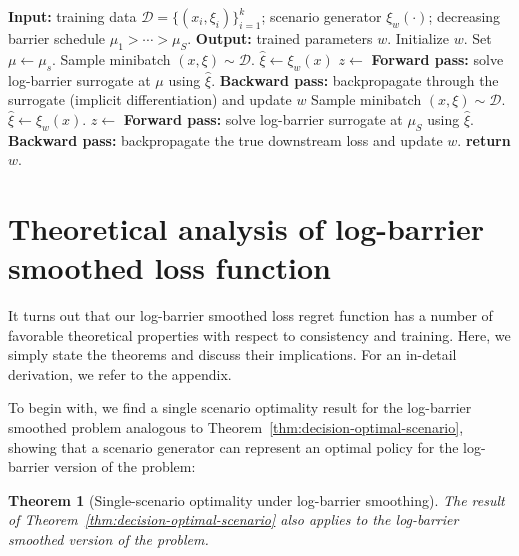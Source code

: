 \documentclass{article}
\theoremstyle{plain}
\newtheorem{theorem}{Theorem}
\theoremstyle{definition}
\theoremstyle{remark}
\begin{document}
\begin{algorithm}[H]
\caption{Interior point based decision-focused scenario generation.}
\label{alg:ip-scenario-gen}
\begin{algorithmic}[1]
\Statex \textbf{Input:} training data $\mathcal D=\{(x_i,\xi_i)\}_{i=1}^k$; scenario generator $\xi_w(\cdot)$;
decreasing barrier schedule $\mu_1>\cdots>\mu_S$.
\Statex \textbf{Output:} trained parameters $w$.
\State Initialize $w$.
 
    \State Set $\mu \gets \mu_s$.
        \State Sample minibatch $(x,\xi)\sim \mathcal D$.
        \State $\hat\xi \gets \xi_w(x)$ 
        \State $z \gets$ \textbf{Forward pass:} solve log-barrier surrogate at $\mu$ using $\hat\xi$.
        \State \textbf{Backward pass:} backpropagate through the surrogate (implicit differentiation) and update $w$
    \EndFor
\EndFor
\State {}
    \State Sample minibatch $(x,\xi)\sim \mathcal D$.
    \State $\hat\xi \gets \xi_w(x)$.
    \State $z \gets$ \textbf{Forward pass:} solve log-barrier surrogate at $\mu_S$ using $\hat\xi$.
    \State \textbf{Backward pass:} backpropagate the true downstream loss and update $w$.
\EndFor
\State \textbf{return} $w$.
\end{algorithmic}
\end{algorithm}

\section{Theoretical analysis of log-barrier smoothed loss function}
\label{sec:theory}
It turns out that our log-barrier smoothed loss regret function has a number of favorable theoretical properties with respect to consistency and training. Here, we simply state the theorems and discuss their implications. For an in-detail derivation, we refer to the appendix.

To begin with, we find a single scenario optimality result for the log-barrier smoothed problem analogous to Theorem~\ref{thm:decision-optimal-scenario}, showing that a scenario generator can represent an optimal policy for the log-barrier version of the problem:
\begin{theorem}[Single-scenario optimality under log-barrier smoothing]
\label{thm:barrier-existence}
The result of Theorem~\ref{thm:decision-optimal-scenario} also applies to the
log-barrier smoothed version of the problem.
\end{theorem}
\end{document}
